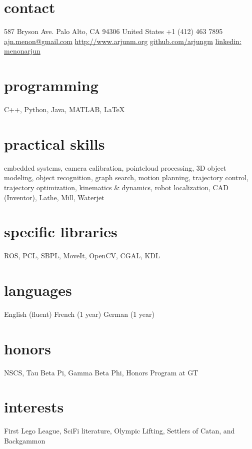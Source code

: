 \documentclass[]{friggeri-cv} %
\begin{document}


\begin{aside} %
\section{contact}
587 Bryson Ave.
Palo Alto, CA 94306
United States
+1 (412) 463 7895
~
\href{mailto:ajn.menon@gmail.com}{ajn.menon@gmail.com}
\href{http://www.arjunm.org}{http://www.arjunm.org}
\href{http://www.github.com/arjungm}{github.com/arjungm}
\href{https://www.linkedin.com/in/menonarjun}{linkedin: menonarjun}
\section{programming}
C++, Python, 
Java, MATLAB, LaTeX
\section{practical skills}
embedded systems,
camera calibration,
pointcloud processing,
3D object modeling,
object recognition,
graph search,
motion planning,
trajectory control,
trajectory optimization,
kinematics \& dynamics,
robot localization,
CAD (Inventor),
Lathe, Mill, Waterjet
\section{specific libraries}
ROS, PCL, SBPL,
MoveIt, OpenCV, 
CGAL, KDL
\section{languages}
English (fluent)
French (1 year)
German (1 year)
\section{honors}
NSCS, Tau Beta Pi, 
Gamma Beta Phi, 
Honors Program at GT
\section{interests}
First Lego League,
SciFi literature, 
Olympic Lifting,
Settlers of Catan,
and Backgammon
\end{aside}
\end{document}
